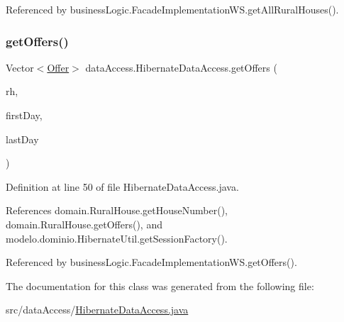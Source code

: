 Referenced by business\+Logic.\+Facade\+Implementation\+W\+S.\+get\+All\+Rural\+Houses().

\mbox{\label{classdataAccess_1_1HibernateDataAccess_a60f1f7e00fb7ccec7fbb799e8a302295}} 
\subsubsection{\texorpdfstring{getOffers()}{getOffers()}}
{\footnotesize\ttfamily Vector$<$\mbox{\hyperlink{classdomain_1_1Offer}{Offer}}$>$ data\+Access.\+Hibernate\+Data\+Access.\+get\+Offers (\begin{DoxyParamCaption}\item[{\mbox{\hyperlink{classdomain_1_1RuralHouse}{Rural\+House}}}]{rh,  }\item[{Date}]{first\+Day,  }\item[{Date}]{last\+Day }\end{DoxyParamCaption})}



Definition at line 50 of file Hibernate\+Data\+Access.\+java.


\begin{DoxyCode}{0}

\end{DoxyCode}


References domain.\+Rural\+House.\+get\+House\+Number(), domain.\+Rural\+House.\+get\+Offers(), and modelo.\+dominio.\+Hibernate\+Util.\+get\+Session\+Factory().



Referenced by business\+Logic.\+Facade\+Implementation\+W\+S.\+get\+Offers().



The documentation for this class was generated from the following file\+:\begin{DoxyCompactItemize}
\item 
src/data\+Access/\mbox{\hyperlink{HibernateDataAccess_8java}{Hibernate\+Data\+Access.\+java}}\end{DoxyCompactItemize}

